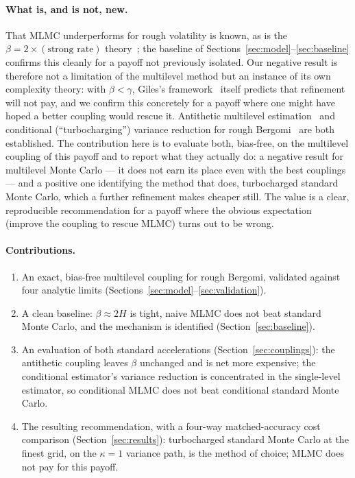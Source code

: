 \documentclass[11pt]{article}
\begin{document}
\paragraph{What is, and is not, new.} That MLMC underperforms for rough volatility is
known, as is the $\beta=2\times(\text{strong rate})$ theory~\cite{bfrs2016}; the baseline
of Sections~\ref{sec:model}--\ref{sec:baseline} confirms this cleanly for a payoff not
previously isolated. Our negative result is therefore not a limitation of the multilevel
method but an instance of its own complexity theory: with $\beta<\gamma$, Giles's
framework~\cite{giles2008,giles2015} itself predicts that refinement will not pay, and we
confirm this concretely for a payoff where one might have hoped a better coupling would
rescue it. Antithetic multilevel estimation~\cite{gilesszpruch2014} and
conditional (``turbocharging'') variance reduction for rough Bergomi~\cite{mccrickerd2018}
are both established. The contribution here is to evaluate both, bias-free, on the
multilevel coupling of this payoff and to report what they actually do: a negative result
for multilevel Monte Carlo --- it does not earn its place even with the best couplings ---
and a positive one identifying the method that does, turbocharged standard Monte Carlo,
which a further refinement makes cheaper still. The value is a clear, reproducible
recommendation for a payoff where the obvious expectation (improve the coupling to rescue
MLMC) turns out to be wrong.

\paragraph{Contributions.}
\begin{enumerate}
\item An exact, bias-free multilevel coupling for rough Bergomi, validated against four
analytic limits (Sections~\ref{sec:model}--\ref{sec:validation}).
\item A clean baseline: $\beta\approx2H$ is tight, naive MLMC does not beat standard
Monte Carlo, and the mechanism is identified (Section~\ref{sec:baseline}).
\item An evaluation of both standard accelerations (Section~\ref{sec:couplings}): the
antithetic coupling leaves $\beta$ unchanged and is net more expensive; the conditional
estimator's variance reduction is concentrated in the single-level estimator, so
conditional MLMC does not beat conditional standard Monte Carlo.
\item The resulting recommendation, with a four-way matched-accuracy cost comparison
(Section~\ref{sec:results}): turbocharged standard Monte Carlo at the finest grid, on the
$\kappa=1$ variance path, is the method of choice; MLMC does not pay for this payoff.
\end{enumerate}
\end{document}
